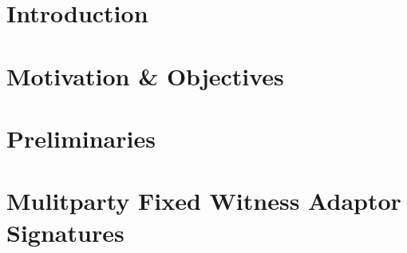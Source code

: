 \documentclass[draft,final]{vutinfth} %
\begin{document}
\frontmatter %

\addstatementpage


\begin{acknowledgements*}
\end{acknowledgements*}


\begin{abstract}
\end{abstract}


\tableofcontents %

\mainmatter

\chapter{Introduction}\label{chapIntro}


\chapter{Motivation \& Objectives}\label{chapMotiv}


\chapter{Preliminaries}\label{chapPre}


\chapter{Mulitparty Fixed Witness Adaptor Signatures}\label{chapMultiApt}

\end{document}
